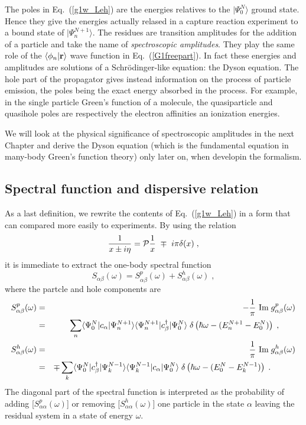 The poles in Eq.~(\ref{g1w_Leh}) are the energies relatives to the $\vert \Psi^N_0 \rangle$ ground state. Hence they give the  energies actually relased in a capture reaction experiment to a bound state of $\vert \Psi^{N+1}_n \rangle$. The residues are transition amplitudes for the addition of a particle and take the name of {\em spectroscopic amplitudes}. They play the same role of the $\langle \phi_n \vert {\bf r} \rangle$ wave function in Eq.~(\ref{G1freepart}). In fact these energies and amplitudes are solutions of a Schr\"odinger-like equation: the Dyson equation.
%
The hole part of the propagator gives instead information on the process of particle emission, the poles being the exact energy absorbed in the process. 
%
For example, in the single particle Green's function of a molecule, the quasiparticle and quasihole poles are respectively  the electron affinities an ionization energies.

 We will look at the physical significance of spectroscopic amplitudes in the next Chapter and derive the Dyson equation (which is the fundamental equation in many-body Green's function theory) only later on, when developin the formalism.


\subsection{Spectral function and dispersive relation}

As a last definition, we rewrite the contents of Eq.~(\ref{g1w_Leh}) in a form that can compared more easily to experiments. By using the relation
\begin{equation}
\frac{1}{x \pm i \eta} = {\cal P} \frac{1}{x} ~ \mp ~ i \pi \delta(x) \; ,
\end{equation}
it is immediate to extract the one-body spectral function
\begin{equation}
 S_{\alpha \beta} (\omega) =  S^p_{\alpha \beta} (\omega) +  S^h_{\alpha \beta} (\omega) \; ,
\label{S1_ab} 
\end{equation}
where the partcle and hole components are
\begin{eqnarray}
 S^p_{\alpha \beta} (\omega) &=& - \frac{1}{\pi} ~ \hbox{Im} \;g^p_{\alpha \beta} (\omega) 
\nonumber \\
            &=&  \sum_n \langle \Psi^N_0 \vert c_\alpha  \vert  \Psi^{N+1}_n  \rangle \langle\Psi^{N+1}_n \vert  c_\beta^\dag  \vert \Psi^N_0 \rangle
             \; \delta \left( \hbar\omega - (E^{N+1}_n - E^N_0) \right) \; , \qquad
\label{S1p_ab} \\
 S^h_{\alpha \beta} (\omega) &=& ~ \frac{1}{\pi} ~ \hbox{Im} \;g^h_{\alpha \beta} (\omega) 
\nonumber  \\
            &=&  \mp \sum_k \langle \Psi^N_0 \vert c_\beta^\dag  \vert \Psi^{N-1}_k  \rangle \langle\Psi^{N-1}_k \vert  c_\alpha \vert \Psi^N_0 \rangle
             \; \delta \left( \hbar\omega - (E^N_0 - E^{N-1}_k) \right) \; . \qquad \quad
\label{S1h_ab} 
\end{eqnarray}
The diagonal part of the spectral function is interpreted as the probability of adding [$S^p_{\alpha \alpha} (\omega)$] or removing [$S^h_{\alpha \alpha} (\omega)$] one particle in the state $\alpha$ leaving the residual system in a state of energy $\omega$.


